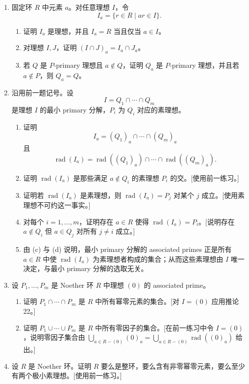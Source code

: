 \begin{enumerate}[label=\arabic*.]
	\item 固定环 $R$ 中元素 $a$。对任意理想 $I$，令
	\[
	I_a=\{r\in R\mid ar\in I\}.
	\]
	\begin{enumerate}[label=(\alph*)]
		\item 证明 $I_a$ 是理想，并且 $I_a=R$ 当且仅当 $a\in I$。
		\item 对理想 $I,J$，证明 $(I\cap J)_a=I_a\cap J_a$。
		\item 若 $Q$ 是 $P$-primary 理想且 $a\notin Q$，证明 $Q_a$ 是 $P$-primary 理想，并且若 $a\notin P$，则 $Q_a=Q$。
	\end{enumerate}
	
	\item 沿用前一题记号。设
	\[
	I=Q_1\cap\cdots\cap Q_m
	\]
	是理想 $I$ 的最小 primary 分解，$P_i$ 为 $Q_i$ 对应的素理想。
	\begin{enumerate}[label=(\alph*)]
		\item 证明
		\[
		I_a=(Q_1)_a\cap\cdots\cap(Q_m)_a
		\]
		且
		\[
		\operatorname{rad}(I_a)=\operatorname{rad}((Q_1)_a)\cap\cdots\cap\operatorname{rad}((Q_m)_a).
		\]
		\item 证明 $\operatorname{rad}(I_a)$ 是那些满足 $a\notin Q_i$ 的素理想 $P_i$ 的交。[使用前一练习。]
		\item 证明若 $\operatorname{rad}(I_a)$ 是素理想，则 $\operatorname{rad}(I_a)=P_j$ 对某个 $j$ 成立。[使用素理想不可约这一事实。]
		\item 对每个 $i=1,
		\ldots,m$，证明存在 $a\in R$ 使得 $\operatorname{rad}(I_a)=P_i$。[说明存在 $a\notin Q_i$ 但 $a\in Q_j$ 对所有 $j\ne i$ 成立。]
		\item 由 (c) 与 (d) 说明，最小 primary 分解的 associated primes 正是所有 $a\in R$ 中使 $\operatorname{rad}(I_a)$ 为素理想者构成的集合；从而这些素理想由 $I$ 唯一决定，与最小 primary 分解的选取无关。
	\end{enumerate}
	
	\item 设 $P_1,
	\ldots,P_m$ 是 Noether 环 $R$ 中理想 $(0)$ 的 associated prime。
	\begin{enumerate}[label=(\alph*)]
		\item 证明 $P_1\cap\cdots\cap P_m$ 是 $R$ 中所有幂零元素的集合。[对 $I=(0)$ 应用推论 22。]
		\item 证明 $P_1\cup\cdots\cup P_m$ 是 $R$ 中所有零因子的集合。[在前一练习中令 $I=(0)$，说明零因子集合由 $\bigcup_{a\in R-(0)}(0)_a=\bigcup_{a\in R-(0)}\operatorname{rad}((0)_a)$ 给出。]
	\end{enumerate}
	
	\item 设 $R$ 是 Noether 环。证明 $R$ 要么是整环，要么含有非零幂零元素，要么至少有两个极小素理想。[使用前一练习。]
	

\end{enumerate}
